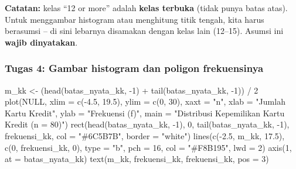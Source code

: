 \documentclass[
  indonesian,
  letterpaper,
]{book}
\newenvironment{Shaded}{\begin{snugshade}}{\end{snugshade}}
\newcommand{\AttributeTok}[1]{\textcolor[rgb]{0.40,0.45,0.13}{#1}}
\newcommand{\ConstantTok}[1]{\textcolor[rgb]{0.56,0.35,0.01}{#1}}
\newcommand{\DecValTok}[1]{\textcolor[rgb]{0.68,0.00,0.00}{#1}}
\newcommand{\FloatTok}[1]{\textcolor[rgb]{0.68,0.00,0.00}{#1}}
\newcommand{\FunctionTok}[1]{\textcolor[rgb]{0.28,0.35,0.67}{#1}}
\newcommand{\NormalTok}[1]{\textcolor[rgb]{0.00,0.23,0.31}{#1}}
\newcommand{\OtherTok}[1]{\textcolor[rgb]{0.00,0.23,0.31}{#1}}
\newcommand{\SpecialCharTok}[1]{\textcolor[rgb]{0.37,0.37,0.37}{#1}}
\newcommand{\StringTok}[1]{\textcolor[rgb]{0.13,0.47,0.30}{#1}}
\begin{document}
\textbf{Catatan:} kelas ``12 or more'' adalah \textbf{kelas terbuka}
(tidak punya batas atas). Untuk menggambar histogram atau menghitung
titik tengah, kita harus berasumsi -- di sini lebarnya disamakan dengan
kelas lain (12--15). Asumsi ini \textbf{wajib dinyatakan}.

\subsubsection{Tugas 4: Gambar histogram dan poligon
frekuensinya}\label{tugas-4-gambar-histogram-dan-poligon-frekuensinya}

\begin{Shaded}
\begin{Highlighting}[]
\NormalTok{m\_kk }\OtherTok{\textless{}{-}}\NormalTok{ (}\FunctionTok{head}\NormalTok{(batas\_nyata\_kk, }\SpecialCharTok{{-}}\DecValTok{1}\NormalTok{) }\SpecialCharTok{+} \FunctionTok{tail}\NormalTok{(batas\_nyata\_kk, }\SpecialCharTok{{-}}\DecValTok{1}\NormalTok{)) }\SpecialCharTok{/} \DecValTok{2}
\FunctionTok{plot}\NormalTok{(}\ConstantTok{NULL}\NormalTok{, }\AttributeTok{xlim =} \FunctionTok{c}\NormalTok{(}\SpecialCharTok{{-}}\FloatTok{4.5}\NormalTok{, }\FloatTok{19.5}\NormalTok{), }\AttributeTok{ylim =} \FunctionTok{c}\NormalTok{(}\DecValTok{0}\NormalTok{, }\DecValTok{30}\NormalTok{), }\AttributeTok{xaxt =} \StringTok{"n"}\NormalTok{,}
\AttributeTok{xlab =} \StringTok{"Jumlah Kartu Kredit"}\NormalTok{, }\AttributeTok{ylab =} \StringTok{"Frekuensi (f)"}\NormalTok{,}
\AttributeTok{main =} \StringTok{"Distribusi Kepemilikan Kartu Kredit (n = 80)"}\NormalTok{)}
\FunctionTok{rect}\NormalTok{(}\FunctionTok{head}\NormalTok{(batas\_nyata\_kk, }\SpecialCharTok{{-}}\DecValTok{1}\NormalTok{), }\DecValTok{0}\NormalTok{, }\FunctionTok{tail}\NormalTok{(batas\_nyata\_kk, }\SpecialCharTok{{-}}\DecValTok{1}\NormalTok{), frekuensi\_kk,}
\AttributeTok{col =} \StringTok{"\#6C5B7B"}\NormalTok{, }\AttributeTok{border =} \StringTok{"white"}\NormalTok{)}
\FunctionTok{lines}\NormalTok{(}\FunctionTok{c}\NormalTok{(}\SpecialCharTok{{-}}\FloatTok{2.5}\NormalTok{, m\_kk, }\FloatTok{17.5}\NormalTok{), }\FunctionTok{c}\NormalTok{(}\DecValTok{0}\NormalTok{, frekuensi\_kk, }\DecValTok{0}\NormalTok{), }\AttributeTok{type =} \StringTok{"b"}\NormalTok{, }\AttributeTok{pch =} \DecValTok{16}\NormalTok{, }\AttributeTok{col =} \StringTok{"\#F8B195"}\NormalTok{, }\AttributeTok{lwd =} \DecValTok{2}\NormalTok{)}
\FunctionTok{axis}\NormalTok{(}\DecValTok{1}\NormalTok{, }\AttributeTok{at =}\NormalTok{ batas\_nyata\_kk)}
\FunctionTok{text}\NormalTok{(m\_kk, frekuensi\_kk, frekuensi\_kk, }\AttributeTok{pos =} \DecValTok{3}\NormalTok{)}
\end{Highlighting}
\end{Shaded}
\end{document}
